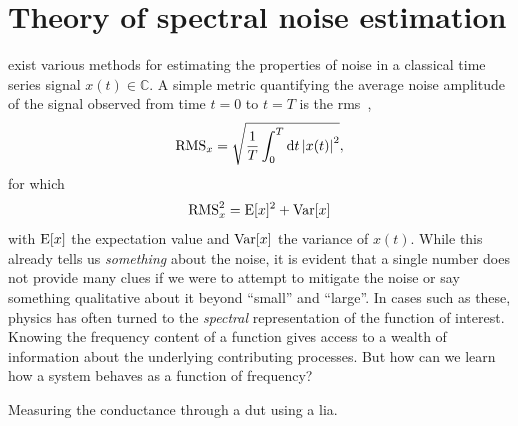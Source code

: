 \chapter{Theory of spectral noise estimation}\label{ch:speck:theory}
 exist various methods for estimating the properties of noise in a classical time series signal $x(t)\in\mathbb{C}$.
A simple metric quantifying the average noise amplitude of the signal observed from time $t=0$ to $t=T$ is the \gls{rms}~\cite{RMSMathworld},
\begin{align}\label{eq:speck:rms:timedomain}
    \operatorname{RMS}_x = \sqrt{\frac{1}{T}\int_{0}^{T}\dd{t}\abs{x(t)}^2},
\end{align}
for which
\begin{equation}
    \operatorname{RMS}_x^2 = \operatorname{E}[x]^2 + \operatorname{Var}[x]
\end{equation}
with $\operatorname{E}[x]$ the expectation value and $\operatorname{Var}[x]$ the variance of $x(t)$.
While this already tells us \emph{something} about the noise, it is evident that a single number does not provide many clues if we were to attempt to mitigate the noise or say something qualitative about it beyond \enquote{small} and \enquote{large}.
In cases such as these, physics has often turned to the \emph{spectral} representation of the function of interest.
Knowing the frequency content of a function gives access to a wealth of information about the underlying contributing processes.
But how can we learn how a system behaves as a function of frequency?

\begin{marginfigure}
    \centering
    
    \caption[]{Measuring the conductance through a \gls{dut} using a \gls{lia}.}
    \label{fig:speck:theory:lockin_dut}
\end{marginfigure}


